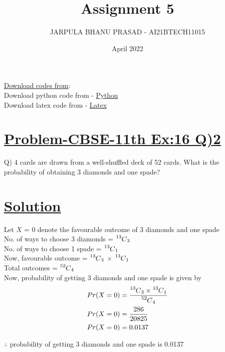 \documentclass[journal,12pt,twocolumn]{IEEEtran}
\title{Assignment 5}
\author{JARPULA BHANU PRASAD - AI21BTECH11015}
\date{April 2022}
\newcommand\Mycomb[2][^n]{\prescript{#1\mkern-0.5mu}{}C_{#2}}
\begin{document}
\maketitle
\noindent \Large\underline{Download codes from}:\\
\noindent \large Download python code from - \href{https://github.com/jarpula-Bhanu/Assignment-5/blob/main/codes/verify.py}{Python}\\ Download latex code from - \href{}{Latex}
\section{\large\underline{Problem-CBSE-11th Ex:16 Q)2}}
\large \noindent Q) 4 cards are drawn from a well-shuffled deck of 52 cards. What is the probability of obtaining 3 diamonds and one spade?
\section{\large\underline{Solution}}
\noindent Let $X$ = 0 denote the favourable outcome of 3 diamonds and one spade \\
No. of ways to choose 3 diamonds = $\Mycomb[13]{3}$ \\
No. of ways to choose 1 spade = $\Mycomb[13]{1}$ \\
Now, favourable outcome = $\Mycomb[13]{3}$ $\times$ $\Mycomb[13]{1}$\\
Total outcomes = $\Mycomb[52]{4}$ \\

Now, probability of getting 3 diamonds and one spade is given by
\begin{align}
& Pr(X = 0) = \frac{\Mycomb[13]{3} \times \Mycomb[13]{1}}{\Mycomb[52]{4}} \\
& Pr(X = 0) = \frac{286}{20825} \\
& Pr(X = 0) = 0.0137
\end{align}

\noindent $\therefore$ probability of getting 3 diamonds and one spade is 0.0137
\end{document}
